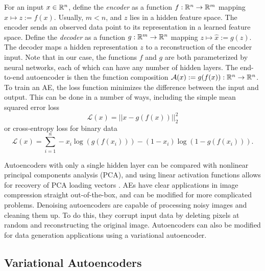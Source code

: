 For an input $x \in \mathbb{R}^n$, define the \textit{encoder} as a function $f: \mathbb{R}^n \to \mathbb{R}^m$ mapping $x \mapsto z := f(x)$. Usually, $m < n$, and $z$ lies in a hidden feature space. The encoder sends an observed data point to its representation in a learned feature space. Define the \textit{decoder} as a function $g: \mathbb{R}^m \to \mathbb{R}^n$ mapping $z \mapsto \hat x := g(z)$. The decoder maps a hidden representation $z$ to a reconstruction of the encoder input. Note that in our case, the functions $f$ and $g$ are both parameterized by neural networks, each of which can have any number of hidden layers. The end-to-end autoencoder is then the function composition $\mathcal{A}(x):= g(f(x)): \mathbb{R}^n \to \mathbb{R}^n$. To train an AE, the loss function minimizes the difference between the input and output. This can be done in a number of ways, including the simple mean squared error loss
\begin{equation}
  \mathcal{L}(x) = || x - g(f(x))||_2^2
  \label{eq:mse}
\end{equation}
or cross-entropy loss for binary data
\begin{equation}
  \mathcal{L}(x) = \sum_{i=1}^n - x_i \log(g(f(x_i))) - (1-x_i)\log(1- g(f(x_i))).
  \label{eq:cross_entropy}
\end{equation}

Autoencoders with only a single hidden layer can be compared with nonlinear principal components analysis (PCA), and using linear activation functions allows for recovery of PCA loading vectors \cite{plaut2018}. AEs have clear applications in image compression straight out-of-the-box, and can be modified for more complicated problems. Denoising autoencoders \cite{vincent2008} are capable of processing noisy images and cleaning them up. To do this, they corrupt input data by deleting pixels at random and reconstructing the original image. Autoencoders can also be modified for data generation applications using a variational autoencoder.

\subsection{Variational Autoencoders}


